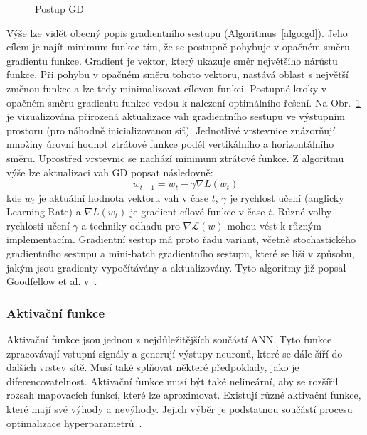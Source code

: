 \begin{figure}[h]
\begin{minipage}{0.4\textwidth}
        \caption{Postup \gls{GD}~\cite{gradientdescent}}
        \label{fig:gd}
    \end{minipage}
\end{figure}

Výše lze vidět obecný popis gradientního sestupu (Algoritmus~\ref{algo:gd}).
Jeho cílem je najít minimum funkce tím, že se postupně pohybuje v opačném směru
gradientu funkce. Gradient je vektor, který ukazuje směr největšího nárůstu
funkce. Při pohybu v opačném směru tohoto vektoru, nastává oblast s největší
změnou funkce a lze tedy minimalizovat cílovou funkci. Postupné kroky v opačném
směru gradientu funkce vedou k nalezení optimálního řešení. Na Obr.~\ref{fig:gd}
je vizualizována přirozená aktualizace vah gradientního sestupu ve výstupním
prostoru (pro náhodně inicializovanou síť). Jednotlivé vrstevnice znázorňují
množiny úrovní hodnot ztrátové funkce podél vertikálního a horizontálního směru.
Uprostřed vrstevnic se nachází minimum ztrátové funkce. Z algoritmu výše lze
aktualizaci vah GD popsat následovně:
\begin{equation}
    w_{t+1} = w_t - \gamma \nabla L(w_t)
\end{equation}
kde $w_t$ je aktuální hodnota vektoru vah v čase $t$, $\gamma$ je rychlost učení
(anglicky Learning Rate) a $\nabla L(w_t)$ je gradient cílové funkce v čase $t$.
Různé volby rychlosti učení $\gamma$ a techniky odhadu pro
$\nabla\mathcal{L}(w)$ mohou vést k různým implementacím. Gradientní sestup má
proto řadu variant, včetně stochastického gradientního sestupu a mini-batch
gradientního sestupu, které se liší v způsobu, jakým jsou gradienty vypočítávány
a aktualizovány. Tyto algoritmy již popsal Goodfellow et al.
v~\cite{Goodfellow2016}.

\subsubsection{Aktivační funkce}
Aktivační funkce jsou jednou z nejdůležitějších součástí \gls{ANN}. Tyto funkce
zpracovávají vstupní signály a generují výstupy neuronů, které se dále šíří do
dalších vrstev sítě. Musí také splňovat některé předpoklady, jako je
diferencovatelnost. Aktivační funkce musí být také nelineární, aby se rozšířil
rozsah mapovacích funkcí, které lze aproximovat. Existují různé aktivační
funkce, které mají své výhody a nevýhody. Jejich výběr je podstatnou součástí
procesu optimalizace hyperparametrů~\cite{sharma2017,Goodfellow2016}.

